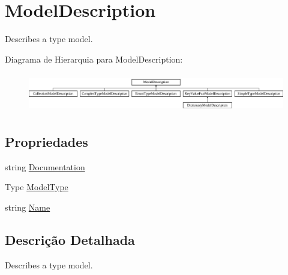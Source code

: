 \hypertarget{classApi3Layers_1_1Areas_1_1HelpPage_1_1ModelDescriptions_1_1ModelDescription}{}\section{Model\+Description}
\label{classApi3Layers_1_1Areas_1_1HelpPage_1_1ModelDescriptions_1_1ModelDescription}


Describes a type model.  


Diagrama de Hierarquia para Model\+Description\+:\begin{figure}[H]
\begin{center}
\leavevmode
\includegraphics[height=1.705584cm]{d7/dd6/classApi3Layers_1_1Areas_1_1HelpPage_1_1ModelDescriptions_1_1ModelDescription}
\end{center}
\end{figure}
\subsection*{Propriedades}
\begin{DoxyCompactItemize}
\item 
string \hyperlink{classApi3Layers_1_1Areas_1_1HelpPage_1_1ModelDescriptions_1_1ModelDescription_a239e2715951fcab2d9b263ef6acfa899}{Documentation}
\item 
Type \hyperlink{classApi3Layers_1_1Areas_1_1HelpPage_1_1ModelDescriptions_1_1ModelDescription_ab4e6bdc2197fcee901bb151c8d9fa3c2}{Model\+Type}
\item 
string \hyperlink{classApi3Layers_1_1Areas_1_1HelpPage_1_1ModelDescriptions_1_1ModelDescription_a7ee9065718e6628dc7791b756fa6c0f9}{Name}
\end{DoxyCompactItemize}


\subsection{Descrição Detalhada}
Describes a type model. 



